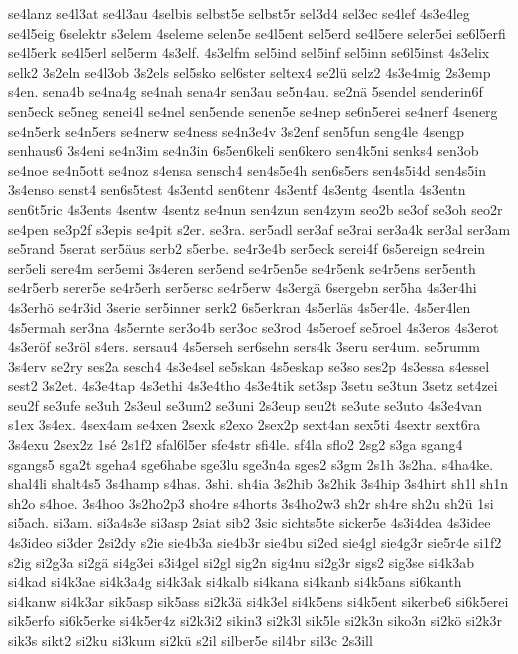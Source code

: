 {se4lanz
se4l3at
se4l3au
4selbis
selbst5e
selbst5r
sel3d4
sel3ec
se4lef
4s3e4leg
se4l5eig
6selektr
s3elem
4seleme
selen5e
se4l5ent
sel5erd
se4l5ere
seler5ei
se6l5erfi
se4l5erk
se4l5erl
sel5erm
4s3elf.
4s3elfm
sel5ind
sel5inf
sel5inn
se6l5inst
4s3elix
selk2
3s2eln
se4l3ob
3s2els
sel5sko
sel6ster
seltex4
se2lü
selz2
4s3e4mig
2s3emp
s4en.
sena4b
se4na4g
se4nah
sena4r
sen3au
se5n4au.
se2nä
5sendel
senderin6f
sen5eck
se5neg
senei4l
se4nel
sen5ende
senen5e
se4nep
se6n5erei
se4nerf
4senerg
se4n5erk
se4n5ers
se4nerw
se4ness
se4n3e4v
3s2enf
sen5fun
seng4le
4sengp
senhaus6
3s4eni
se4n3im
se4n3in
6s5en6keli
sen6kero
sen4k5ni
senks4
sen3ob
se4noe
se4n5ott
se4noz
s4ensa
sensch4
sen4s5e4h
sen6s5ers
sen4s5i4d
sen4s5in
3s4enso
senst4
sen6s5test
4s3entd
sen6tenr
4s3entf
4s3entg
4sentla
4s3entn
sen6t5ric
4s3ents
4sentw
4sentz
se4nun
sen4zun
sen4zym
seo2b
se3of
se3oh
seo2r
se4pen
se3p2f
s3epis
se4pit
s2er.
se3ra.
ser5adl
ser3af
se3rai
ser3a4k
ser3al
ser3am
se5rand
5serat
ser5äus
serb2
s5erbe.
se4r3e4b
ser5eck
serei4f
6s5ereign
se4rein
ser5eli
sere4m
ser5emi
3s4eren
ser5end
se4r5en5e
se4r5enk
se4r5ens
ser5enth
se4r5erb
serer5e
se4r5erh
ser5ersc
se4r5erw
4s3ergä
6sergebn
ser5ha
4s3er4hi
4s3erhö
se4r3id
3serie
ser5inner
serk2
6s5erkran
4s5erläs
4s5er4le.
4s5er4len
4s5ermah
ser3na
4s5ernte
ser3o4b
ser3oc
se3rod
4s5eroef
se5roel
4s3eros
4s3erot
4s3eröf
se3röl
s4ers.
sersau4
4s5erseh
ser6sehn
sers4k
3seru
ser4um.
se5rumm
3s4erv
se2ry
ses2a
sesch4
4s3e4sel
se5skan
4s5eskap
se3so
ses2p
4s3essa
s4essel
sest2
3s2et.
4s3e4tap
4s3ethi
4s3e4tho
4s3e4tik
set3sp
3setu
se3tun
3setz
set4zei
seu2f
se3ufe
se3uh
2s3eul
se3um2
se3uni
2s3eup
seu2t
se3ute
se3uto
4s3e4van
s1ex
3s4ex.
4sex4am
se4xen
2sexk
s2exo
2sex2p
sext4an
sex5ti
4sextr
sext6ra
3s4exu
2sex2z
1sé
2s1f2
sfal6l5er
sfe4str
sfi4le.
sf4la
sflo2
2sg2
s3ga
sgang4
sgangs5
sga2t
sgeha4
sge6habe
sge3lu
sge3n4a
sges2
s3gm
2s1h
3s2ha.
s4ha4ke.
shal4li
shalt4s5
3s4hamp
s4has.
3shi.
sh4ia
3s2hib
3s2hik
3s4hip
3s4hirt
sh1l
sh1n
sh2o
s4hoe.
3s4hoo
3s2ho2p3
sho4re
s4horts
3s4ho2w3
sh2r
sh4re
sh2u
sh2ü
1si
si5ach.
si3am.
si3a4s3e
si3asp
2siat
sib2
3sic
sichts5te
sicker5e
4s3i4dea
4s3idee
4s3ideo
si3der
2si2dy
s2ie
sie4b3a
sie4b3r
sie4bu
si2ed
sie4gl
sie4g3r
sie5r4e
si1f2
s2ig
si2g3a
si2gä
si4g3ei
s3i4gel
si2gl
sig2n
sig4nu
si2g3r
sigs2
sig3se
si4k3ab
si4kad
si4k3ae
si4k3a4g
si4k3ak
si4kalb
si4kana
si4kanb
si4k5ans
si6kanth
si4kanw
si4k3ar
sik5asp
sik5ass
si2k3ä
si4k3el
si4k5ens
si4k5ent
sikerbe6
si6k5erei
sik5erfo
si6k5erke
si4k5er4z
si2k3i2
sikin3
si2k3l
sik5le
si2k3n
siko3n
si2kö
si2k3r
sik3s
sikt2
si2ku
si3kum
si2kü
s2il
silber5e
sil4br
sil3c
2s3ill
}
